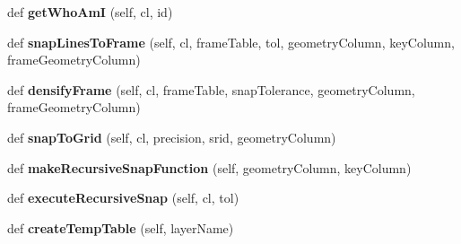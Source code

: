 \begin{DoxyCompactItemize}
def {\bfseries get\+Who\+AmI} (self, cl, id)
\item 
\mbox{\label{class_dsg_tools_1_1_factories_1_1_sql_factory_1_1postgis_sql_generator_1_1_post_g_i_s_sql_generator_a9b6b2410a2b12e2009c079d24af4f04c}} 
def {\bfseries snap\+Lines\+To\+Frame} (self, cl, frame\+Table, tol, geometry\+Column, key\+Column, frame\+Geometry\+Column)
\item 
\mbox{\label{class_dsg_tools_1_1_factories_1_1_sql_factory_1_1postgis_sql_generator_1_1_post_g_i_s_sql_generator_a5d875f9fb469170192622bba18c99cc1}} 
def {\bfseries densify\+Frame} (self, cl, frame\+Table, snap\+Tolerance, geometry\+Column, frame\+Geometry\+Column)
\item 
\mbox{\label{class_dsg_tools_1_1_factories_1_1_sql_factory_1_1postgis_sql_generator_1_1_post_g_i_s_sql_generator_ace23f6a566d2bd1b375de39e87035249}} 
def {\bfseries snap\+To\+Grid} (self, cl, precision, srid, geometry\+Column)
\item 
\mbox{\label{class_dsg_tools_1_1_factories_1_1_sql_factory_1_1postgis_sql_generator_1_1_post_g_i_s_sql_generator_a4bdcebfbf0ffbfbeb099ed98ba0781d5}} 
def {\bfseries make\+Recursive\+Snap\+Function} (self, geometry\+Column, key\+Column)
\item 
\mbox{\label{class_dsg_tools_1_1_factories_1_1_sql_factory_1_1postgis_sql_generator_1_1_post_g_i_s_sql_generator_a900bb6ddf45740895ee018bba6d83818}} 
def {\bfseries execute\+Recursive\+Snap} (self, cl, tol)
\item 
\mbox{\label{class_dsg_tools_1_1_factories_1_1_sql_factory_1_1postgis_sql_generator_1_1_post_g_i_s_sql_generator_acd81756d2a282a7b0275532705641b4e}} 
def {\bfseries create\+Temp\+Table} (self, layer\+Name)

\end{DoxyCompactItemize}

